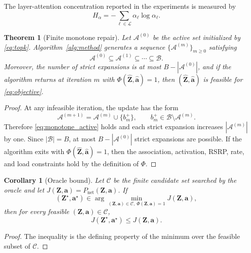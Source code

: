 \documentclass[journal]{IEEEtran}
\newtheorem{theorem}{Theorem}
\newtheorem{corollary}{Corollary}
\begin{document}
\noindent The layer-attention concentration reported in the experiments is
measured by
\begin{equation}
    H_{\alpha}=-\sum_{\ell\in\mathcal{L}}\alpha_{\ell}\log\alpha_{\ell}.
    \label{eq:attention_entropy}
\end{equation}

\begin{theorem}[Finite monotone repair]
Let $\mathcal{A}^{(0)}$ be the active set initialized by
\eqref{eq:topk}. Algorithm~\ref{alg:method} generates a sequence
$\{\mathcal{A}^{(m)}\}_{m\geq0}$ satisfying
\begin{equation}
    \mathcal{A}^{(0)}\subseteq\mathcal{A}^{(1)}
    \subseteq\cdots\subseteq\mathcal{B}.
    \label{eq:monotone_active}
\end{equation}
Moreover, the number of strict expansions is at most $B-|\mathcal{A}^{(0)}|$,
and if the algorithm returns at iteration $m$ with
$\Phi(\widehat{\mathbf{Z}},\widehat{\mathbf{a}})=1$, then
$(\widehat{\mathbf{Z}},\widehat{\mathbf{a}})$ is feasible for
\eqref{eq:objective}.
\end{theorem}
\begin{proof}
At any infeasible iteration, the update has the form
\begin{equation}
    \mathcal{A}^{(m+1)}
    =
    \mathcal{A}^{(m)}\cup\{b^{+}_m\},\qquad
    b^{+}_m\in\mathcal{B}\setminus\mathcal{A}^{(m)}.
\end{equation}
Therefore \eqref{eq:monotone_active} holds and each strict expansion increases
$|\mathcal{A}^{(m)}|$ by one. Since $|\mathcal{B}|=B$, at most
$B-|\mathcal{A}^{(0)}|$ strict expansions are possible. If the algorithm exits
with $\Phi(\widehat{\mathbf{Z}},\widehat{\mathbf{a}})=1$, then the association,
activation, RSRP, rate, and load constraints hold by the definition of
$\Phi$.
\end{proof}

\begin{corollary}[Oracle bound]
Let $\mathcal{C}$ be the finite candidate set searched by the oracle and let
$J(\mathbf{Z},\mathbf{a})=P_{\mathrm{net}}(\mathbf{Z},\mathbf{a})$. If
\begin{equation}
    (\mathbf{Z}^{\star},\mathbf{a}^{\star})
    \in\arg\min_{(\mathbf{Z},\mathbf{a})\in\mathcal{C},\ \Phi(\mathbf{Z},\mathbf{a})=1}
    J(\mathbf{Z},\mathbf{a}),
\end{equation}
then for every feasible
$(\mathbf{Z},\mathbf{a})\in\mathcal{C}$,
\begin{equation}
    J(\mathbf{Z}^{\star},\mathbf{a}^{\star})
    \leq J(\mathbf{Z},\mathbf{a}).
\end{equation}
\end{corollary}
\begin{proof}
The inequality is the defining property of the minimum over the feasible subset
of $\mathcal{C}$.
\end{proof}
\end{document}
